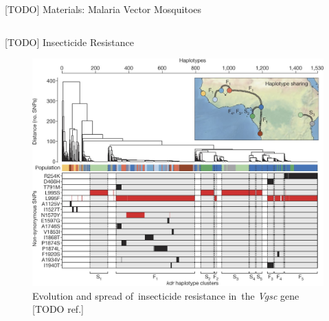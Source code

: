 \documentclass[final,hyperref={pdfpagelabels=false}]{beamer}
\begin{document}
\begin{frame}[t]
\begin{columns}[t]
\begin{column}{.465\textwidth}
\begin{block}{[TODO] Materials: Malaria Vector Mosquitoes}
\begin{columns}
\begin{column}{.6\textwidth}
\end{column}

\end{columns} %
\end{block}


\begin{block}{[TODO] Insecticide Resistance}

\begin{figure}
\includegraphics[width=.95\linewidth]{nature-mosquitoes/fig_4}
\caption{Evolution and spread of~insecticide resistance in~the \textit{Vgsc} gene [TODO ref.]}
\end{figure}

\end{block}


\end{column} %


\end{columns}
\end{frame}
\end{document}
